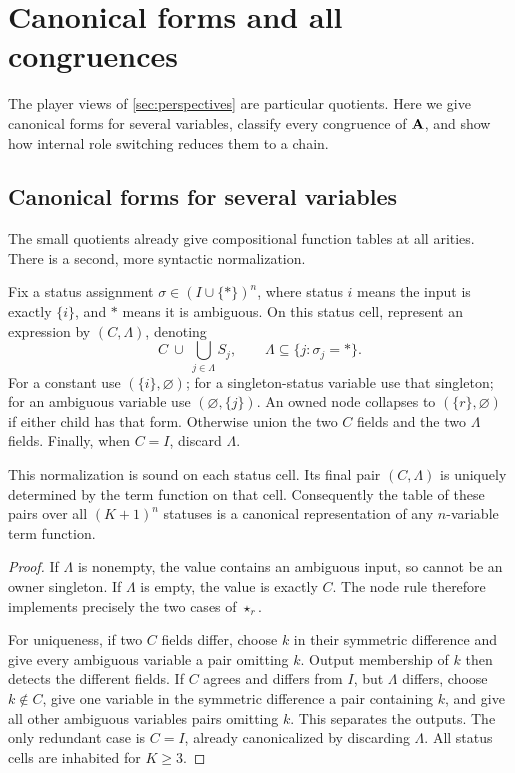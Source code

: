 \section{Canonical forms and all congruences}\label{app:congruences}
The player views of \cref{sec:perspectives} are particular quotients. Here we give canonical forms for several variables,
classify every congruence of $\mathbf A$, and show how internal role switching reduces them to a chain.

\subsection{Canonical forms for several variables}

The small quotients already give compositional function tables at all
arities. There is a second, more syntactic normalization.

Fix a status assignment
$\sigma\in(I\cup\{*\})^n$, where status $i$ means the input is exactly
$\{i\}$, and $*$ means it is ambiguous. On this status cell, represent an
expression by $(C,\Lambda)$, denoting
\[
 C\ \cup\ \bigcup_{j\in \Lambda}S_j,
 \qquad \Lambda\subseteq\{j:\sigma_j=*\}.
\]
For a constant use $(\{i\},\varnothing)$; for a singleton-status variable
use that singleton; for an ambiguous variable use
$(\varnothing,\{j\})$. An owned node collapses to
$(\{r\},\varnothing)$ if either child has that form. Otherwise union the
two $C$ fields and the two $\Lambda$ fields. Finally, when $C=I$, discard $\Lambda$.

\begin{proposition}\label{view:thm:normal}
This normalization is sound on each status cell. Its final pair $(C,\Lambda)$
is uniquely determined by the term function on that cell. Consequently
the table of these pairs over all $(K+1)^n$ statuses is a canonical
representation of any $n$-variable term function.
\end{proposition}
\begin{proof}
If $\Lambda$ is nonempty, the value contains an ambiguous input, so cannot be
an owner singleton. If $\Lambda$ is empty, the value is exactly $C$. The node
rule therefore implements precisely the two cases of $\star_r$.

For uniqueness, if two $C$ fields differ, choose $k$ in their symmetric
difference and give every ambiguous variable a pair omitting $k$.
Output membership of $k$ then detects the different fields. If $C$
agrees and differs from $I$, but $\Lambda$ differs, choose $k\notin C$, give one
variable in the symmetric difference a pair containing $k$, and give all
other ambiguous variables pairs omitting $k$. This separates the
outputs. The only redundant case is $C=I$, already canonicalized by
discarding $\Lambda$. All status cells are inhabited for $K\geq3$.
\end{proof}

